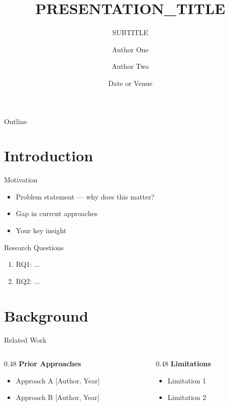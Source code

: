 \documentclass[aspectratio=169]{beamer}
\title{{{PRESENTATION\_TITLE}}}
\subtitle{{{SUBTITLE}}}
\author{{{Author One}} \and {{Author Two}}}
\institute{{{Affiliation}}}
\date{{{Date or Venue}}}
\begin{document}
\begin{frame}
    \titlepage
\end{frame}

\begin{frame}{Outline}
    \tableofcontents
\end{frame}

\section{Introduction}

\begin{frame}{Motivation}
    \begin{itemize}
        \item {{Problem statement — why does this matter?}}
        \item {{Gap in current approaches}}
        \item {{Your key insight}}
    \end{itemize}
\end{frame}

\begin{frame}{Research Questions}
    \begin{enumerate}
        \item {{RQ1: ...}}
        \item {{RQ2: ...}}
    \end{enumerate}
\end{frame}

\section{Background}

\begin{frame}{Related Work}
    \begin{columns}[T]
        \begin{column}{0.48\textwidth}
            \textbf{Prior Approaches}
            \begin{itemize}
                \item {{Approach A [Author, Year]}}
                \item {{Approach B [Author, Year]}}
            \end{itemize}
        \end{column}
        \begin{column}{0.48\textwidth}
            \textbf{Limitations}
            \begin{itemize}
                \item {{Limitation 1}}
                \item {{Limitation 2}}
            \end{itemize}
        \end{column}
    \end{columns}
\end{frame}
\end{document}
